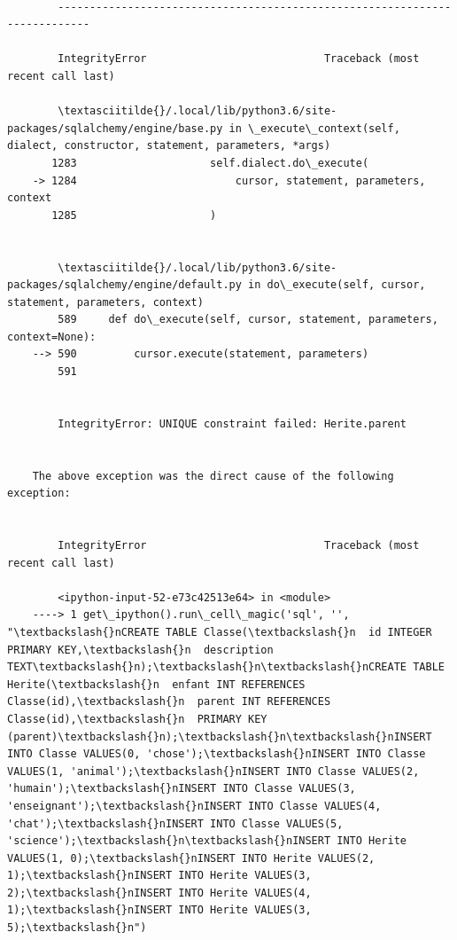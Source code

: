\documentclass[11pt]{article}
\begin{document}
    \begin{Verbatim}[commandchars=\\\{\}]

        ---------------------------------------------------------------------------

        IntegrityError                            Traceback (most recent call last)

        \textasciitilde{}/.local/lib/python3.6/site-packages/sqlalchemy/engine/base.py in \_execute\_context(self, dialect, constructor, statement, parameters, *args)
       1283                     self.dialect.do\_execute(
    -> 1284                         cursor, statement, parameters, context
       1285                     )


        \textasciitilde{}/.local/lib/python3.6/site-packages/sqlalchemy/engine/default.py in do\_execute(self, cursor, statement, parameters, context)
        589     def do\_execute(self, cursor, statement, parameters, context=None):
    --> 590         cursor.execute(statement, parameters)
        591 


        IntegrityError: UNIQUE constraint failed: Herite.parent

        
    The above exception was the direct cause of the following exception:


        IntegrityError                            Traceback (most recent call last)

        <ipython-input-52-e73c42513e64> in <module>
    ----> 1 get\_ipython().run\_cell\_magic('sql', '', "\textbackslash{}nCREATE TABLE Classe(\textbackslash{}n  id INTEGER PRIMARY KEY,\textbackslash{}n  description TEXT\textbackslash{}n);\textbackslash{}n\textbackslash{}nCREATE TABLE Herite(\textbackslash{}n  enfant INT REFERENCES Classe(id),\textbackslash{}n  parent INT REFERENCES Classe(id),\textbackslash{}n  PRIMARY KEY (parent)\textbackslash{}n);\textbackslash{}n\textbackslash{}nINSERT INTO Classe VALUES(0, 'chose');\textbackslash{}nINSERT INTO Classe VALUES(1, 'animal');\textbackslash{}nINSERT INTO Classe VALUES(2, 'humain');\textbackslash{}nINSERT INTO Classe VALUES(3, 'enseignant');\textbackslash{}nINSERT INTO Classe VALUES(4, 'chat');\textbackslash{}nINSERT INTO Classe VALUES(5, 'science');\textbackslash{}n\textbackslash{}nINSERT INTO Herite VALUES(1, 0);\textbackslash{}nINSERT INTO Herite VALUES(2, 1);\textbackslash{}nINSERT INTO Herite VALUES(3, 2);\textbackslash{}nINSERT INTO Herite VALUES(4, 1);\textbackslash{}nINSERT INTO Herite VALUES(3, 5);\textbackslash{}n")
    


\end{Verbatim}
\end{document}
